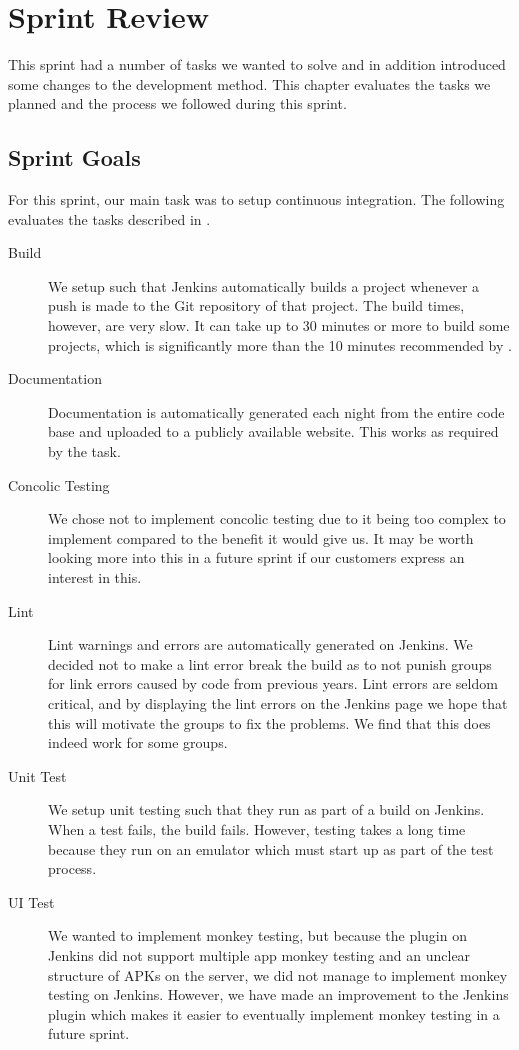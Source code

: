 \chapter{Sprint Review}\label{chap:sprint1_end}
This sprint had a number of tasks we wanted to solve and in addition introduced some changes to the development method. This chapter evaluates the tasks we planned and the process we followed during this sprint.

\section{Sprint Goals}
For this sprint, our main task was to setup continuous integration. The following evaluates the tasks described in .

\begin{description}
  \item[Build] We setup such that Jenkins automatically builds a project whenever a push is made to the Git repository of that project. The build times, however, are very slow. It can take up to 30 minutes or more to build some projects, which is significantly more than the 10 minutes recommended by \textcite{beck2004}.
  \item[Documentation] Documentation is automatically generated each night from the entire code base and uploaded to a publicly available website. This works as required by the task.
  \item[Concolic Testing] We chose not to implement concolic testing due to it being too complex to implement compared to the benefit it would give us. It may be worth looking more into this in a future sprint if our customers express an interest in this.
  \item[Lint] Lint warnings and errors are automatically generated on Jenkins. We decided not to make a lint error break the build as to not punish groups for link errors caused by code from previous years. Lint errors are seldom critical, and by displaying the lint errors on the Jenkins page we hope that this will motivate the groups to fix the problems. We find that this does indeed work for some groups.
  \item[Unit Test] We setup unit testing such that they run as part of a build on Jenkins. When a test fails, the build fails. However, testing takes a long time because they run on an emulator which must start up as part of the test process.
  \item[UI Test] We wanted to implement monkey testing, but because the plugin on Jenkins did not support multiple app monkey testing and an unclear structure of APKs on the server, we did not manage to implement monkey testing on Jenkins. However, we have made an improvement to the Jenkins plugin which makes it easier to eventually implement monkey testing in a future sprint.
\end{description}

